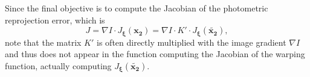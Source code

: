 Since the final objective is to compute the Jacobian of the photometric reprojection error,
which is
\[
	J = \nabla I \cdot J_{\bm{\xi}}(\bm{x_2})
	  = \nabla I \cdot K' \cdot J_{\bm{\xi}}(\bm{\tilde{x_2}}),
\]
note that the matrix $K'$ is often directly multiplied with
the image gradient $\nabla I$
and thus does not appear in the function computing the Jacobian of the warping function,
actually computing $J_{\bm{\xi}}(\bm{\tilde{x_2}})$.

